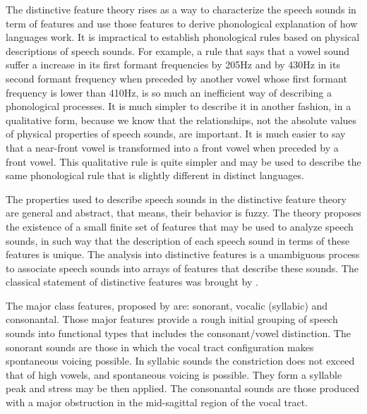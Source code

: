The distinctive feature theory rises as a way to characterize the speech sounds in term of features and use those features to derive phonological explanation of how languages work. It is impractical to establish phonological rules based on physical descriptions of speech sounds. For example, a rule that says that a vowel sound suffer a increase in its first formant frequencies by 205Hz and by 430Hz in its second formant frequency when preceded by another vowel whose first formant frequency is lower than 410Hz, is so much an inefficient way of describing a phonological processes. It is much simpler to describe it in another fashion, in a qualitative form, because we know that the relationships, not the absolute values of physical properties of speech sounds, are important. It is much easier to say that a near-front vowel is transformed into a front vowel when preceded by a front vowel. This qualitative rule is quite simpler and may be used to describe the same phonological rule that is slightly different in distinct languages.

The properties used to describe speech sounds in the distinctive feature theory are general and abstract, that means, their behavior is fuzzy. The theory proposes the existence of a small finite set of features that may be used to analyze speech sounds, in such way that the description of each speech sound in terms of these features is unique. The analysis into distinctive features is a unambiguous process to associate speech sounds into arrays of features that describe these sounds. The classical statement of distinctive features was brought by \citet{chomsky1968a}.
 
The major class features, proposed by \citet{chomsky1968a} are: sonorant, vocalic (syllabic) and consonantal. Those major features provide a rough initial grouping of speech sounds into functional types that includes the consonant/vowel distinction. The sonorant sounds are those in which the vocal tract configuration makes spontaneous voicing possible. In syllabic sounds the constriction does not exceed that of high vowels, and spontaneous voicing is possible. They form a syllable peak and stress may be then applied. The consonantal sounds are those produced with a major obstruction in the mid-sagittal region of the vocal tract.

